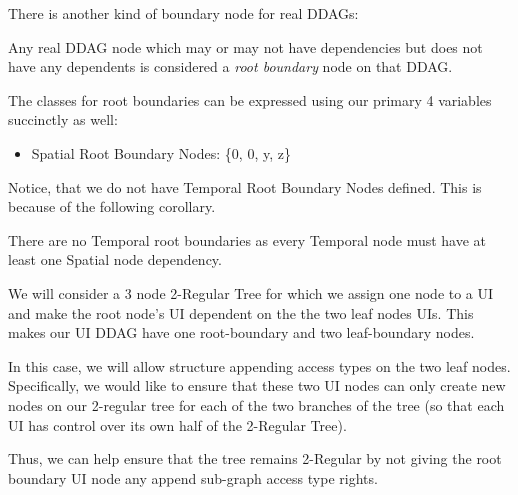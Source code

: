 There is another kind of boundary node for real DDAGs:

\begin{con-def}
	\label{root-boundaries}
	Any real DDAG node which may or may not have dependencies but does not have any dependents is considered a \textit{root boundary} node on that DDAG.
\end{con-def}

The classes for root boundaries can be expressed using our primary 4 variables succinctly as well:

\begin{itemize}
	\item Spatial Root Boundary Nodes: \{0, 0, y, z\}
\end{itemize}

Notice, that we do not have Temporal Root Boundary Nodes defined. This is because of the following corollary.

\begin{con-cor}
	\label{no-temp-root-bounds}
	There are no Temporal root boundaries as every Temporal node must have at least one Spatial node dependency.
\end{con-cor}

\begin{con-ex} 
	\label{2-regular-tree}
	We will consider a 3 node 2-Regular Tree for which we assign one node to a UI and make the root node's UI dependent on the the two leaf nodes UIs. This makes our UI DDAG have one root-boundary and two leaf-boundary nodes.


In this case, we will allow structure appending access types on the two leaf nodes. Specifically, we would like to ensure that these two UI nodes can only create new nodes on our 2-regular tree for each of the two branches of the tree (so that each UI has control over its own half of the 2-Regular Tree).

Thus, we can help ensure that the tree remains 2-Regular by not giving the root boundary UI node any append sub-graph access type rights.
\end{con-ex}

